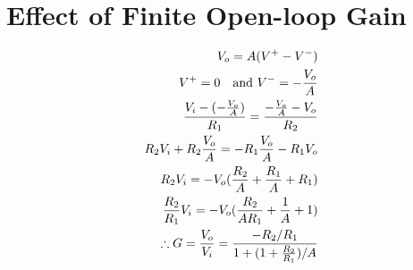 \documentclass[a4paper, 12pt]{report}
\begin{document}
\section{Effect of Finite Open-loop Gain}
\begin{equation}
    \notag
    \begin{align*}
    V_o = A(V^+ - V^-)\\
    V^+ = 0 \quad \text{and\ } V^- = -\frac{V_o}{A}\\
    \frac{V_i-(-\frac{V_o}{A})}{R_1} = \frac{-\frac{V_o}{A}-V_o}{R_2}\\
    R_2 V_i + R_2\frac{V_o}{A} = -R_1\frac{V_o}{A} - R_1V_o\\
    R_2 V_i = -V_o(\frac{R_2}{A} + \frac{R_1}{A} + R_1)\\
    \frac{R_2}{R_1}V_i=-V_o(\frac{R_2}{AR_1} + \frac{1}{A} + 1)\\
    \therefore G = \frac{V_o}{V_i} = \frac{-R_2/R_1}{1 + (1 + \frac{R_2}{R_1})/A}
    \end{align*}
\end{equation}
\end{document}
